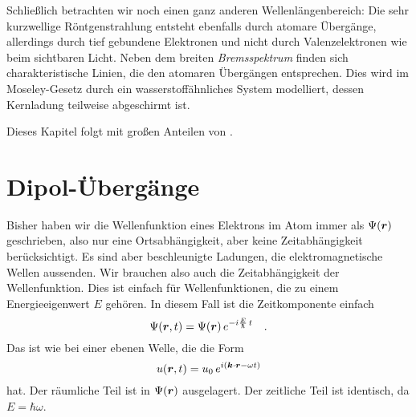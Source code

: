 Schließlich betrachten wir noch einen ganz anderen Wellenlängenbereich: Die sehr kurzwellige Röntgenstrahlung entsteht ebenfalls durch atomare Übergänge, allerdings durch tief gebundene Elektronen und nicht durch Valenzelektronen wie beim sichtbaren Licht. Neben dem breiten \emph{Bremsspektrum} finden sich charakteristische Linien, die den atomaren Übergängen entsprechen. Dies wird im Moseley-Gesetz durch ein wasserstoffähnliches System modelliert, dessen Kernladung teilweise abgeschirmt ist.

Dieses Kapitel folgt \cite{Harris_moderne_Physik} mit großen Anteilen von \cite{Demtröder_ep3}.




\section{Dipol-Übergänge}

Bisher haben wir die Wellenfunktion eines Elektrons im Atom immer als $\Psi(\boldsymbol{r})$ geschrieben, also nur eine Ortsabhängigkeit, aber keine Zeitabhängigkeit berücksichtigt. Es sind aber beschleunigte Ladungen, die elektromagnetische Wellen aussenden. Wir brauchen also auch die Zeitabhängigkeit der Wellenfunktion. Dies ist einfach für Wellenfunktionen, die zu einem Energieeigenwert $E$ gehören. In diesem Fall ist die Zeitkomponente einfach 
\begin{equation}
    \Psi(\boldsymbol{r}, t) = \Psi(\boldsymbol{r}) \, e^{- i \frac{E}{\hbar} \, t} \quad .
\end{equation}
Das ist wie bei einer ebenen Welle, die die Form 
\begin{equation}
    u(\boldsymbol{r}, t) = u_0 \, e^{i ( \boldsymbol{k} \cdot \boldsymbol{r} - \omega t)}
\end{equation}
hat. Der räumliche Teil ist in $\Psi(\boldsymbol{r})$ ausgelagert. Der zeitliche Teil ist identisch, da $E = \hbar \omega$.

